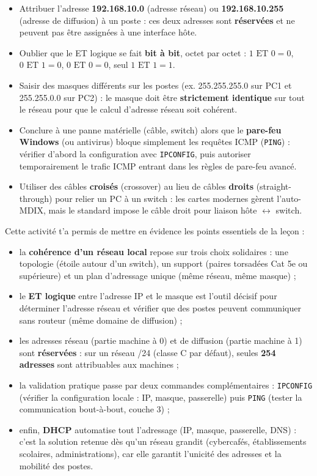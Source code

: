 \documentclass[11pt]{article}
\newcounter{popsec}
\newcounter{popsub}
\newcommand{\courssub}[1]{%
  \stepcounter{popsub}%
  \par\vspace{9pt}\noindent{\popxbold\fontsize{11.5}{13}\selectfont\color{popink}{\color{poporange}\thepopsec.\thepopsub}\hspace{6pt}#1}\par\nopagebreak\vspace{4pt}
}
\begin{document}
\begin{attention}
\begin{itemize}
\item Attribuer l'adresse \textbf{192.168.10.0} (adresse réseau) ou \textbf{192.168.10.255} (adresse de diffusion) à un poste : ces deux adresses sont \textbf{réservées} et ne peuvent pas être assignées à une interface hôte.
\item Oublier que le ET logique se fait \textbf{bit à bit}, octet par octet : $1 \text{ ET } 0 = 0$, $0 \text{ ET } 1 = 0$, $0 \text{ ET } 0 = 0$, seul $1 \text{ ET } 1 = 1$.
\item Saisir des masques différents sur les postes (ex. 255.255.255.0 sur PC1 et 255.255.0.0 sur PC2) : le masque doit être \textbf{strictement identique} sur tout le réseau pour que le calcul d'adresse réseau soit cohérent.
\item Conclure à une panne matérielle (câble, switch) alors que le \textbf{pare-feu Windows} (ou antivirus) bloque simplement les requêtes ICMP (\texttt{PING}) : vérifier d'abord la configuration avec \texttt{IPCONFIG}, puis autoriser temporairement le trafic ICMP entrant dans les règles de pare-feu avancé.
\item Utiliser des câbles \textbf{croisés} (crossover) au lieu de câbles \textbf{droits} (straight-through) pour relier un PC à un switch : les cartes modernes gèrent l'auto-MDIX, mais le standard impose le câble droit pour liaison hôte $\leftrightarrow$ switch.
\end{itemize}
\end{attention}

\courssub{Bilan de l'activité}

Cette activité t'a permis de mettre en évidence les points essentiels de la leçon :

\begin{itemize}
\item la \textbf{cohérence d'un réseau local} repose sur trois choix solidaires : une topologie (étoile autour d'un switch), un support (paires torsadées Cat 5e ou supérieure) et un plan d'adressage unique (même réseau, même masque) ;
\item le \textbf{ET logique} entre l'adresse IP et le masque est l'outil décisif pour déterminer l'adresse réseau et vérifier que des postes peuvent communiquer sans routeur (même domaine de diffusion) ;
\item les adresses réseau (partie machine à 0) et de diffusion (partie machine à 1) sont \textbf{réservées} : sur un réseau /24 (classe C par défaut), seules \textbf{254 adresses} sont attribuables aux machines ;
\item la validation pratique passe par deux commandes complémentaires : \texttt{IPCONFIG} (vérifier la configuration locale : IP, masque, passerelle) puis \texttt{PING} (tester la communication bout-à-bout, couche 3) ;
\item enfin, \textbf{DHCP} automatise tout l'adressage (IP, masque, passerelle, DNS) : c'est la solution retenue dès qu'un réseau grandit (cybercafés, établissements scolaires, administrations), car elle garantit l'unicité des adresses et la mobilité des postes.
\end{itemize}
\end{document}
